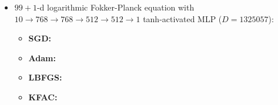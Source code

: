 \begin{itemize}
\item $99+1$-d logarithmic Fokker-Planck equation with $10 \to 768 \to 768 \to 512 \to 512 \to 1$ tanh-activated MLP ($D=\num{1325057}$):
  \begin{itemize}
    \def\pathToRuns{kfac_pinns_exp/exp45_log_fokker_planck99d_isotropic_gaussian_random/tex}
  \item \textbf{SGD:} 
  \item \textbf{Adam:} 
  \item \textbf{LBFGS:} 
  \item \textbf{KFAC:} 
  \end{itemize}
\end{itemize}

